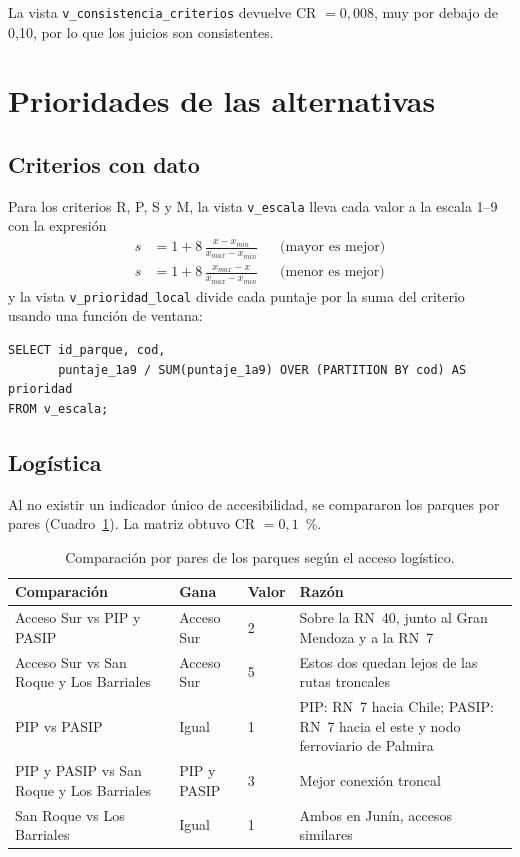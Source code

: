 \documentclass[runningheads]{llncs}
\begin{document}
La vista \texttt{v\_consistencia\_criterios} devuelve CR $=0,008$, muy por debajo de 0,10, por lo que los juicios son consistentes.

\section{Prioridades de las alternativas}
\subsection{Criterios con dato}
Para los criterios R, P, S y M, la vista \texttt{v\_escala} lleva cada valor a la escala 1--9 con la expresión
\begin{align*}
s &= 1 + 8\,\frac{x - x_{min}}{x_{max} - x_{min}} && \text{(mayor es mejor)}\\
s &= 1 + 8\,\frac{x_{max} - x}{x_{max} - x_{min}} && \text{(menor es mejor)}
\end{align*}
y la vista \texttt{v\_prioridad\_local} divide cada puntaje por la suma del criterio usando una función de ventana:
\begin{lstlisting}
SELECT id_parque, cod,
       puntaje_1a9 / SUM(puntaje_1a9) OVER (PARTITION BY cod) AS prioridad
FROM v_escala;
\end{lstlisting}

\subsection{Logística}
Al no existir un indicador único de accesibilidad, se compararon los parques por pares (Cuadro~\ref{tab:complog}). La matriz obtuvo CR $=0,1$~\%.

\begin{table}[H]
\centering
\small
\caption{Comparación por pares de los parques según el acceso logístico.}\label{tab:complog}
\begin{tabular}{|p{3.4cm}|p{1.6cm}|p{0.8cm}|p{5.1cm}|}
\hline
Comparación & Gana & Valor & Razón\\
\hline
Acceso Sur vs PIP y PASIP & Acceso Sur & 2 & Sobre la RN~40, junto al Gran Mendoza y a la RN~7\\
Acceso Sur vs San Roque y Los Barriales & Acceso Sur & 5 & Estos dos quedan lejos de las rutas troncales\\
PIP vs PASIP & Igual & 1 & PIP: RN~7 hacia Chile; PASIP: RN~7 hacia el este y nodo ferroviario de Palmira\\
PIP y PASIP vs San Roque y Los Barriales & PIP y PASIP & 3 & Mejor conexión troncal\\
San Roque vs Los Barriales & Igual & 1 & Ambos en Junín, accesos similares\\
\hline
\end{tabular}
\end{table}
\end{document}
